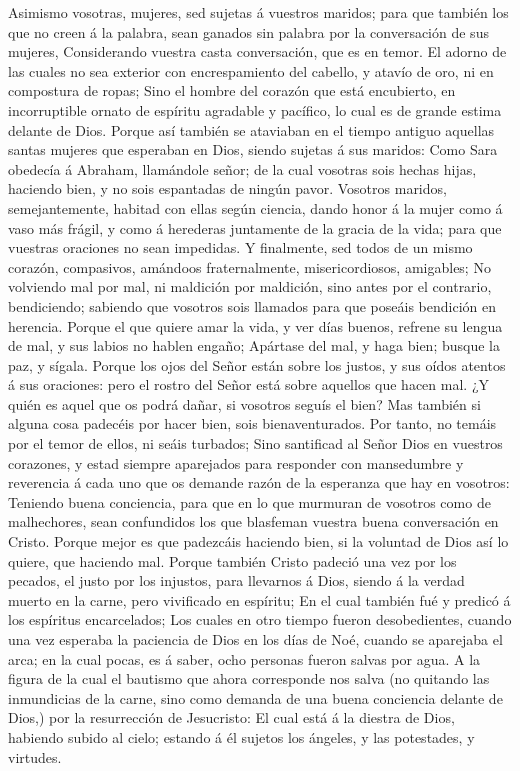  Asimismo vosotras, mujeres, sed sujetas á vuestros maridos;
para que también los que no creen á la palabra, sean ganados sin palabra
por la conversación de sus mujeres,  Considerando vuestra
casta conversación, que es en temor.  El adorno de las
cuales no sea exterior con encrespamiento del cabello, y atavío de oro,
ni en compostura de ropas;  Sino el hombre del corazón que
está encubierto, en incorruptible ornato de espíritu agradable y
pacífico, lo cual es de grande estima delante de Dios. 
Porque así también se ataviaban en el tiempo antiguo aquellas santas
mujeres que esperaban en Dios, siendo sujetas á sus maridos:
 Como Sara obedecía á Abraham, llamándole señor; de la cual
vosotras sois hechas hijas, haciendo bien, y no sois espantadas de
ningún pavor.  Vosotros maridos, semejantemente, habitad con
ellas según ciencia, dando honor á la mujer como á vaso más frágil, y
como á herederas juntamente de la gracia de la vida; para que vuestras
oraciones no sean impedidas.  Y finalmente, sed todos de un
mismo corazón, compasivos, amándoos fraternalmente, misericordiosos,
amigables;  No volviendo mal por mal, ni maldición por
maldición, sino antes por el contrario, bendiciendo; sabiendo que
vosotros sois llamados para que poseáis bendición en herencia.
 Porque el que quiere amar la vida, y ver días buenos,
refrene su lengua de mal, y sus labios no hablen engaño; 
Apártase del mal, y haga bien; busque la paz, y sígala. 
Porque los ojos del Señor están sobre los justos, y sus oídos atentos á
sus oraciones: pero el rostro del Señor está sobre aquellos que hacen
mal.  ¿Y quién es aquel que os podrá dañar, si vosotros
seguís el bien?  Mas también si alguna cosa padecéis por
hacer bien, sois bienaventurados. Por tanto, no temáis por el temor de
ellos, ni seáis turbados;  Sino santificad al Señor Dios en
vuestros corazones, y estad siempre aparejados para responder con
mansedumbre y reverencia á cada uno que os demande razón de la esperanza
que hay en vosotros:  Teniendo buena conciencia, para que
en lo que murmuran de vosotros como de malhechores, sean confundidos los
que blasfeman vuestra buena conversación en Cristo.  Porque
mejor es que padezcáis haciendo bien, si la voluntad de Dios así lo
quiere, que haciendo mal.  Porque también Cristo padeció
una vez por los pecados, el justo por los injustos, para llevarnos á
Dios, siendo á la verdad muerto en la carne, pero vivificado en
espíritu;  En el cual también fué y predicó á los espíritus
encarcelados;  Los cuales en otro tiempo fueron
desobedientes, cuando una vez esperaba la paciencia de Dios en los días
de Noé, cuando se aparejaba el arca; en la cual pocas, es á saber, ocho
personas fueron salvas por agua.  A la figura de la cual el
bautismo que ahora corresponde nos salva (no quitando las inmundicias de
la carne, sino como demanda de una buena conciencia delante de Dios,)
por la resurrección de Jesucristo:  El cual está á la
diestra de Dios, habiendo subido al cielo; estando á él sujetos los
ángeles, y las potestades, y virtudes.

